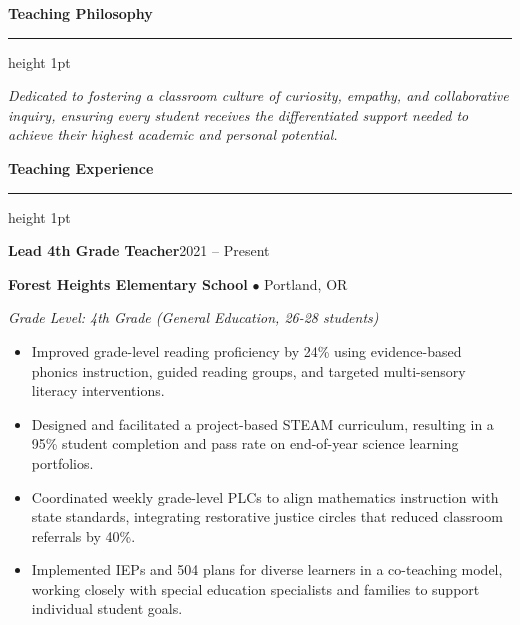 \documentclass[10pt,letterpaper]{article}
\newcommand{\sectiontitle}[1]{%
  \vspace{0.25cm}%
  {\large\bfseries\color{accent} #1}%
  \par\vspace{-0.1cm}%
  {\color{linecolor}\hrule height 1pt}%
  \par\vspace{0.2cm}%
}
\begin{document}
\begin{minipage}[t]{0.65\linewidth}
  \sectiontitle{Teaching Philosophy}
  {\raggedright\itshape\color{dark}
    Dedicated to fostering a classroom culture of curiosity, empathy, and collaborative inquiry, ensuring every student receives the differentiated support needed to achieve their highest academic and personal potential.\par
  }
  \vspace{0.35cm}

  \sectiontitle{Teaching Experience}
  
  {\raggedright\textbf{\large Lead 4th Grade Teacher}\hfill{\color{light}\small 2021 -- Present}\par}%
  {\raggedright{\color{accent}\bfseries Forest Heights Elementary School} $\bullet$ {\color{light}\small Portland, OR}\par}%
  {\raggedright{\small\itshape Grade Level: 4th Grade (General Education, 26-28 students)}\par}%
  \begin{itemize}[leftmargin=*, noitemsep, topsep=3pt, parsep=2pt, itemsep=2pt]
    \item Improved grade-level reading proficiency by 24\% using evidence-based phonics instruction, guided reading groups, and targeted multi-sensory literacy interventions.
    \item Designed and facilitated a project-based STEAM curriculum, resulting in a 95\% student completion and pass rate on end-of-year science learning portfolios.
    \item Coordinated weekly grade-level PLCs to align mathematics instruction with state standards, integrating restorative justice circles that reduced classroom referrals by 40\%.
    \item Implemented IEPs and 504 plans for diverse learners in a co-teaching model, working closely with special education specialists and families to support individual student goals.
  \end{itemize}
  \vspace{0.35cm}


\end{minipage}
\end{document}
